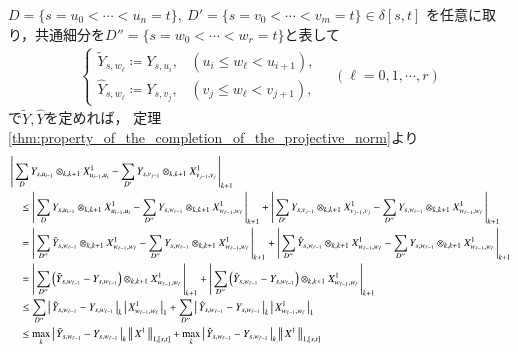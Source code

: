 	\begin{prf}
		$D=\{s=u_0 < \cdots <u_n= t\},\ D'=\{s=v_0 < \cdots <v_m= t\} \in \delta[s,t]$
		を任意に取り，共通細分を$D''=\{s=w_0 < \cdots < w_r = t\}$と表して
		\begin{align}
			\begin{cases}
				\tilde{Y}_{s,w_\ell} \coloneqq Y_{s,u_i}, & (u_i \leq w_\ell < u_{i+1}), \\
				\hat{Y}_{s,w_\ell} \coloneqq Y_{s,v_j}, & (v_j \leq w_\ell < v_{j+1}),
			\end{cases}
			\quad (\ell=0,1,\cdots,r)
		\end{align}
		で$\tilde{Y},\hat{Y}$を定めれば，
		定理\ref{thm:property_of_the_completion_of_the_projective_norm}より
		\begin{align}
			&\compcrossnorm{ \sum_D Y_{s,u_{i-1}} \otimes_{k,k+1} X^1_{u_{i-1},u_i} - 
				\sum_{D'} Y_{s,v_{j-1}} \otimes_{k,k+1} X^1_{v_{j-1},v_j}}{k+1} \\
			&\quad\leq \compcrossnorm{ \sum_D Y_{s,u_{i-1}} \otimes_{k,k+1} X^1_{u_{i-1},u_i} - 
				\sum_{D''} Y_{s,w_{\ell-1}} \otimes_{k,k+1} X^1_{w_{\ell-1},w_\ell}}{k+1}
				+ \compcrossnorm{ \sum_{D'} Y_{s,v_{j-1}} \otimes_{k,k+1} X^1_{v_{j-1},v_j} - 
				\sum_{D''} Y_{s,w_{\ell-1}} \otimes_{k,k+1} X^1_{w_{\ell-1},w_\ell}}{k+1} \\
			&\quad= \compcrossnorm{ \sum_{D''} \tilde{Y}_{s,w_{\ell-1}} \otimes_{k,k+1} X^1_{w_{\ell-1},w_\ell} - 
				\sum_{D''} Y_{s,w_{\ell-1}} \otimes_{k,k+1} X^1_{w_{\ell-1},w_\ell}}{k+1} 
				+ \compcrossnorm{ \sum_{D''} \hat{Y}_{s,w_{\ell-1}} \otimes_{k,k+1} X^1_{w_{\ell-1},w_\ell} - 
				\sum_{D''} Y_{s,w_{\ell-1}} \otimes_{k,k+1} X^1_{w_{\ell-1},w_\ell}}{k+1} \\
			&\quad= \compcrossnorm{ \sum_{D''} \left(\tilde{Y}_{s,w_{\ell-1}} - Y_{s,w_{\ell-1}} \right)
		 		\otimes_{k,k+1} X^1_{w_{\ell-1},w_\ell}}{k+1}
				+ \compcrossnorm{ \sum_{D''} \left( \hat{Y}_{s,w_{\ell-1}} - Y_{s,w_{\ell-1}} \right)
				\otimes_{k,k+1} X^1_{w_{\ell-1},w_\ell}}{k+1} \\
			&\quad\leq \sum_{D''} \compcrossnorm{\tilde{Y}_{s,w_{\ell-1}} - Y_{s,w_{\ell-1}}}{k} \compcrossnorm{X^1_{w_{\ell-1},w_\ell}}{1}
				+ \sum_{D''} \compcrossnorm{\hat{Y}_{s,w_{\ell-1}} - Y_{s,w_{\ell-1}}}{k} \compcrossnorm{X^1_{w_{\ell-1},w_\ell}}{1} \\
			&\quad\leq \max{k}{\compcrossnorm{\tilde{Y}_{s,w_{\ell-1}} - Y_{s,w_{\ell-1}}}{k}} 
				\Norm{X^1}{1,[s,t]} + \max{k}{\compcrossnorm{\hat{Y}_{s,w_{\ell-1}} - Y_{s,w_{\ell-1}}}{k}} \Norm{X^1}{1,[s,t]}

\end{align}
\end{prf}
